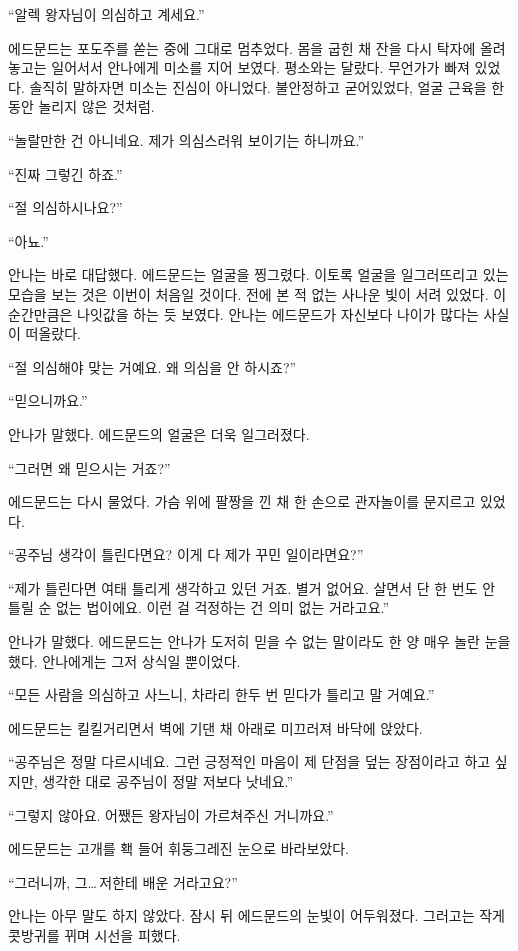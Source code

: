 ``알렉 왕자님이 의심하고 계세요.''

에드문드는 포도주를 쏟는 중에 그대로 멈추었다. 몸을 굽힌 채 잔을 다시 탁자에 올려놓고는 일어서서 안나에게 미소를 지어 보였다. 평소와는 달랐다. 무언가가 빠져 있었다. 솔직히 말하자면 미소는 진심이 아니었다. 불안정하고 굳어있었다, 얼굴 근육을 한동안 놀리지 않은 것처럼.

``놀랄만한 건 아니네요. 제가 의심스러워 보이기는 하니까요.''

``진짜 그렇긴 하죠.''

``절 의심하시나요?''

``아뇨.''

안나는 바로 대답했다. 에드문드는 얼굴을 찡그렸다. 이토록 얼굴을 일그러뜨리고 있는 모습을 보는 것은 이번이 처음일 것이다. 전에 본 적 없는 사나운 빛이 서려 있었다. 이 순간만큼은 나잇값을 하는 듯 보였다. 안나는 에드문드가 자신보다 나이가 많다는 사실이 떠올랐다.

``절 의심해야 맞는 거예요. 왜 의심을 안 하시죠?''

``믿으니까요.''

안나가 말했다. 에드문드의 얼굴은 더욱 일그러졌다.

``그러면 왜 믿으시는 거죠?''

에드문드는 다시 물었다. 가슴 위에 팔짱을 낀 채 한 손으로 관자놀이를 문지르고 있었다.

``공주님 생각이 틀린다면요? 이게 다 제가 꾸민 일이라면요?''

``제가 틀린다면 여태 틀리게 생각하고 있던 거죠. 별거 없어요. 살면서 단 한 번도 안 틀릴 순 없는 법이에요. 이런 걸 걱정하는 건 의미 없는 거라고요.''

안나가 말했다. 에드문드는 안나가 도저히 믿을 수 없는 말이라도 한 양 매우 놀란 눈을 했다. 안나에게는 그저 상식일 뿐이었다.

``모든 사람을 의심하고 사느니, 차라리 한두 번 믿다가 틀리고 말 거예요.''

에드문드는 킬킬거리면서 벽에 기댄 채 아래로 미끄러져 바닥에 앉았다.

``공주님은 정말 다르시네요. 그런 긍정적인 마음이 제 단점을 덮는 장점이라고 하고 싶지만, 생각한 대로 공주님이 정말 저보다 낫네요.''

``그렇지 않아요. 어쨌든 왕자님이 가르쳐주신 거니까요.''

에드문드는 고개를 홱 들어 휘둥그레진 눈으로 바라보았다.

``그러니까, 그\ldots\,저한테 배운 거라고요?''

안나는 아무 말도 하지 않았다. 잠시 뒤 에드문드의 눈빛이 어두워졌다. 그러고는 작게 콧방귀를 뀌며 시선을 피했다.

